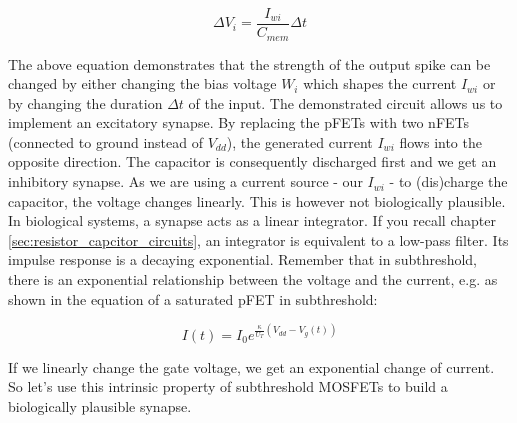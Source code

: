 \begin{equation}
    \Delta V_i = \frac{I_{wi}}{C_{mem}} \Delta t
\end{equation}

The above equation demonstrates that the strength of the output spike can be changed by either changing the bias voltage $W_i$ which shapes the current $I_{wi}$ or by changing the duration $\Delta t$ of the input. The demonstrated circuit allows us to implement an excitatory synapse. By replacing the pFETs with two nFETs (connected to ground instead of $V_{dd}$), the generated current $I_{wi}$ flows into the opposite direction. The capacitor is consequently discharged first and we get an inhibitory synapse. As we are using a current source - our $I_{wi}$ - to (dis)charge the capacitor, the voltage changes linearly. This is however not biologically plausible. In biological systems, a synapse acts as a linear integrator. If you recall chapter \ref{sec:resistor_capcitor_circuits}, an integrator is equivalent to a low-pass filter. Its impulse response is a decaying exponential. Remember that in subthreshold, there is an exponential relationship between the voltage and the current, e.g. as shown in the equation of a saturated pFET in subthreshold:

\begin{equation}
    I(t) = I_0 e^{\frac{\kappa}{U_T}(V_{dd}-V_g(t))}
\end{equation}

If we linearly change the gate voltage, we get an exponential change of current. So let's use this intrinsic property of subthreshold MOSFETs to build a biologically plausible synapse.




